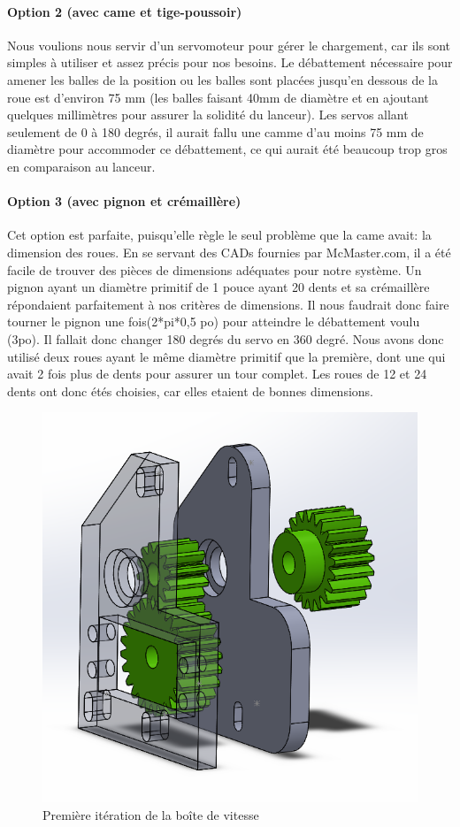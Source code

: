 \paragraph{Option 2 (avec came et tige-poussoir)}
Nous voulions nous servir d’un servomoteur pour gérer le chargement, car ils sont simples à utiliser et assez précis pour nos besoins.
Le débattement nécessaire pour amener les balles de la position ou les balles sont placées jusqu’en dessous de la roue est d’environ 75 mm (les balles faisant 40mm de diamètre et en ajoutant quelques millimètres pour assurer la solidité du lanceur).
Les servos allant seulement de 0 à 180 degrés, il aurait fallu une camme d’au moins 75 mm de diamètre pour accommoder ce débattement, ce qui aurait été beaucoup trop gros en comparaison au lanceur.

\paragraph{Option 3 (avec pignon et crémaillère)}
Cet option est parfaite, puisqu’elle règle le seul problème que la came avait: la dimension des roues.
En se servant des CADs fournies par McMaster.com, il a été facile de trouver des pièces de dimensions adéquates pour notre système.
Un pignon ayant un diamètre primitif de 1 pouce ayant 20 dents et sa crémaillère répondaient parfaitement à nos critères de dimensions.
Il nous faudrait donc faire tourner le pignon une fois(2*pi*0,5 po) pour atteindre le débattement voulu (3po).
Il fallait donc changer 180 degrés du servo en 360 degré.
Nous avons donc utilisé deux roues ayant le même diamètre primitif que la première, dont une qui avait 2 fois plus de dents pour assurer un tour complet.
Les roues de 12 et 24 dents ont donc étés choisies, car elles etaient de bonnes dimensions.

\begin{figure}[h!]
    \centering
    \includegraphics[width=0.5\linewidth]{img/s2/cad/gearbox1}
    \caption{Première itération de la boîte de vitesse}
    \label{fig:s2-cad-gearbox1}
\end{figure}

